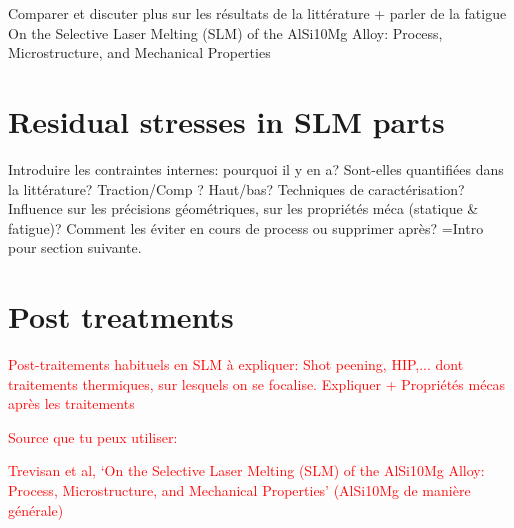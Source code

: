  Comparer et discuter plus sur les résultats de la littérature + parler de la fatigue\\
 
 On the Selective Laser Melting (SLM) of the AlSi10Mg Alloy: Process, Microstructure, and Mechanical Properties\\
 
 
%

\section{Residual stresses in SLM parts}
Introduire les contraintes internes: pourquoi il y en a? Sont-elles quantifiées dans la littérature? Traction/Comp ? Haut/bas? Techniques de caractérisation? Influence sur les précisions géométriques, sur les propriétés méca (statique \& fatigue)? Comment les éviter en cours de process ou supprimer après? =Intro pour section suivante.\\

\section{Post treatments}
\textcolor{red}{Post-traitements habituels en SLM à expliquer: Shot peening, HIP,... dont traitements thermiques, sur lesquels on se focalise. Expliquer + Propriétés mécas après les traitements}

\textcolor{red}{Source que tu peux utiliser:}

\textcolor{red}{Trevisan et al, ‘On the Selective Laser Melting (SLM) of the AlSi10Mg Alloy: Process, Microstructure, and Mechanical Properties’ (AlSi10Mg de manière générale)}

